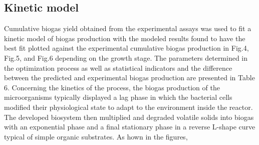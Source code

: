 \subsection{Kinetic model}
Cumulative biogas yield obtained from the experimental assays was used to fit a kinetic model of biogas production with the modeled results found to have the best fit plotted against the experimental cumulative biogas production in Fig.4, Fig.5, and Fig.6 depending on the growth stage. The parameters determined in the optimization process as well as statistical indicators and the difference between the predicted and experimental biogas production are presented in Table 6.
Concerning the kinetics of the process, the biogas production of the microorganisms typically displayed a lag phase in which the bacterial cells modified their physiological state to adapt to the environment inside the reactor. The developed biosystem then multiplied and degraded volatile solids into biogas with an exponential phase and a final stationary phase in a reverse L-shape curve typical of simple organic substrates. As hown in the figures,     